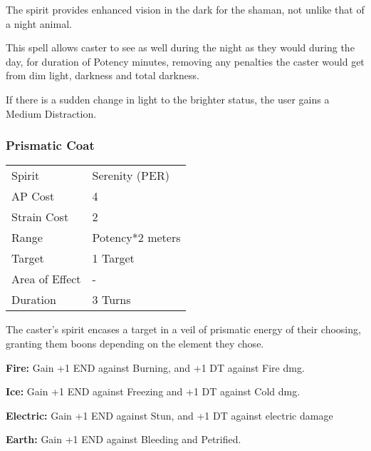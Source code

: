\documentclass[11pt,a4paper,twocolumn]{book}
\begin{document}
\medskip

The spirit provides enhanced vision in the dark for the shaman, not unlike that of a night animal.

This spell allows caster to see as well during the night as they would during the day, for duration of Potency minutes, removing any penalties the caster would get from dim light, darkness and total darkness. 

If there is a sudden change in light to the brighter status, the user gains a Medium Distraction.

\subsubsection*{Prismatic Coat}
{
	\begin{tabu} to 75mm{| X[l,4] | X[l,7] |}
		\hline
		Spirit         & Serenity (PER)   \\
		AP Cost        & 4                \\
		Strain Cost    & 2                \\
		Range          & Potency*2 meters \\
		Target         & 1 Target         \\
		Area of Effect & -                \\
		Duration       & 3 Turns          \\ \hline
	\end{tabu}
	
}

\medskip

The caster's spirit encases a target in a veil of prismatic energy of their choosing, granting them boons depending on the element they chose.

\begin{compactitem}
	\item \textbf{Fire:} Gain +1 END against Burning, and +1 DT against Fire dmg.
	\item \textbf{Ice:} Gain +1 END against Freezing and +1 DT against Cold dmg.
	\item \textbf{Electric:} Gain +1 END against Stun, and +1 DT against electric damage
	\item \textbf{Earth:} Gain +1 END against Bleeding and Petrified.
\end{compactitem}
\end{document}
